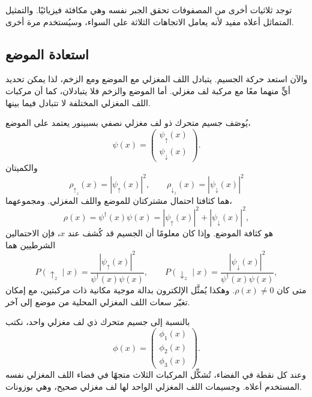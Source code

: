 توجد ثلاثيات أخرى من المصفوفات تحقق الجبر نفسه وهي مكافئة فيزيائيًا. والتمثيل المتماثل أعلاه مفيد لأنه يعامل الاتجاهات الثلاثة على السواء، وسيُستخدم مرة أخرى.

\subsection{استعادة الموضع}

والآن استعد حركة الجسيم. يتبادل اللف المغزلي مع الموضع ومع الزخم، لذا يمكن تحديد أيٍّ منهما معًا مع مركبة لف مغزلي. أما الموضع والزخم فلا يتبادلان، كما أن مركبات اللف المغزلي المختلفة لا تتبادل فيما بينها.

يُوصَف جسيم متحرك ذو لف مغزلي نصفي بسبينور يعتمد على الموضع،
\begin{equation}
\psi(x)=
\begin{pmatrix}
\psi_\uparrow(x)\\
\psi_\downarrow(x)
\end{pmatrix}.
\end{equation}
والكميتان
\begin{equation}
\rho_{\uparrow_z}(x)=|\psi_\uparrow(x)|^2,
\qquad
\rho_{\downarrow_z}(x)=|\psi_\downarrow(x)|^2
\end{equation}
هما كثافتا احتمال مشتركتان للموضع واللف المغزلي. ومجموعهما،
\begin{equation}
\rho(x)=\psi^\dagger(x)\psi(x)
=|\psi_\uparrow(x)|^2+|\psi_\downarrow(x)|^2,
\end{equation}
هو كثافة الموضع. وإذا كان معلومًا أن الجسيم قد كُشف عند \(x\)، فإن الاحتمالين الشرطيين هما
\begin{equation}
P(\uparrow_z\mid x)
=
\frac{|\psi_\uparrow(x)|^2}{\psi^\dagger(x)\psi(x)},
\qquad
P(\downarrow_z\mid x)
=
\frac{|\psi_\downarrow(x)|^2}{\psi^\dagger(x)\psi(x)},
\end{equation}
متى كان \(\rho(x)\neq0\). وهكذا يُمثَّل الإلكترون بدالة موجية مكانية ذات مركبتين، مع إمكان تغيّر سعات اللف المغزلي المحلية من موضع إلى آخر.

بالنسبة إلى جسيم متحرك ذي لف مغزلي واحد، نكتب
\begin{equation}
\phi(x)=
\begin{pmatrix}
\phi_1(x)\\
\phi_2(x)\\
\phi_3(x)
\end{pmatrix}.
\end{equation}
وعند كل نقطة في الفضاء، تُشكِّل المركبات الثلاث متجهًا في فضاء اللف المغزلي نفسه المستخدم أعلاه. وجسيمات اللف المغزلي الواحد لها لف مغزلي صحيح، وهي بوزونات.


